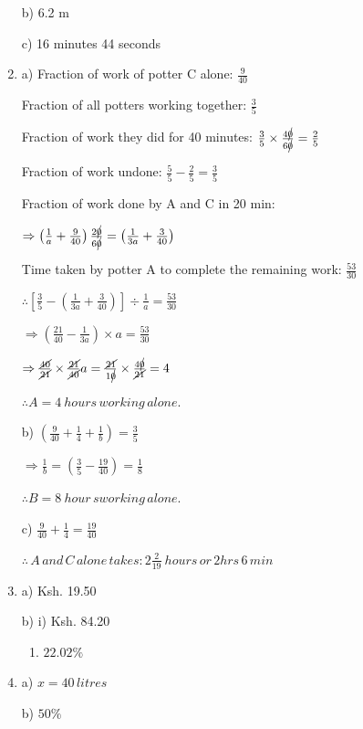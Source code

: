\documentclass[
  a4paperpaper,
]{scrbook}
\providecommand{\tightlist}{%
  \setlength{\itemsep}{0pt}\setlength{\parskip}{0pt}}\usepackage{longtable,booktabs,array}
\begin{document}
\begin{tcolorbox}
\begin{enumerate}
  b) 6.2 m

  c) 16 minutes 44 seconds
\item
  a) Fraction of work of potter C alone: \(\frac{9}{40}\)

  Fraction of all potters working together: \(\frac{3}{5}\)

  Fraction of work they did for 40 minutes:
  \(\frac{3}{5}\times \frac{4\cancel{0}}{6\cancel{0}}=\frac{2}{5}\)

  Fraction of work undone: \(\frac{5}{5}-\frac{2}{5}=\frac{3}{5}\)

  Fraction of work done by A and C in 20 min:

  \(\Rightarrow \left(\frac{1}{a}+\frac{9}{40}\right)\frac{2\cancel{{0}}}{6\cancel{0}}=\left(\frac{1}{3a}+\frac{3}{40}\right)\)

  Time taken by potter A to complete the remaining work:
  \(\frac{53}{30}\)

  \(\therefore \left[\frac{3}{5}-\left(\frac{1}{3a}+\frac{3}{40}\right)\right]\div \frac{1}{a}=\frac{53}{30}\)

  \(\Rightarrow \left(\frac{21}{40}-\frac{1}{3a}\right)\times a=\frac{53}{30}\)

  \(\Rightarrow \frac{\cancel{40}}{\cancel{21}}\times \frac{\cancel{21}}{\cancel{40}}a=\frac{\cancel{21}}{1\cancel{0}}\times \frac{4\cancel{0}}{\cancel{21}}=4\)

  \(\therefore A=4\: hours\, working \,alone.\)

  b) \(\left(\frac{9}{40}+\frac{1}{4}+\frac{1}{b}\right)=\frac{3}{5}\)

  \(\Rightarrow \frac{1}{b}=\left(\frac{3}{5}-\frac{19}{40}\right)=\frac{1}{8}\)

  \(\therefore B=8 \:hour\,sworking \,alone.\)

  c) \(\frac{9}{40}+\frac{1}{4}=\frac{19}{40}\)

  \(\therefore\, A \,and\, C \,alone \,takes:2\frac{2}{19}\:hours\,or \,2hrs \,6\, min\)
\item
  a) Ksh. 19.50

  b) i) Ksh. 84.20

  \begin{enumerate}
  \def\labelenumii{\roman{enumii})}
  \setcounter{enumii}{1}
  \tightlist
  \item
    \(22.02\%\)
  \end{enumerate}
\item
  a) \(x=40 \,litres\)

  b) \(50\%\)


\end{enumerate}
\end{tcolorbox}
\end{document}
